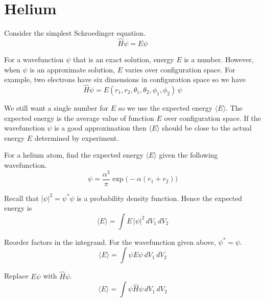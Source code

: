 \documentclass[12pt]{article}
\begin{document}
\section*{Helium}
Consider the simplest Schroedinger equation.
\begin{equation*}
\hat{H}\psi=E\psi
\end{equation*}

For a wavefunction $\psi$ that is an exact solution, energy $E$ is a number.
However, when $\psi$ is an approximate solution, $E$ varies over configuration space.
For example, two electrons have six dimensions in configuration space so we have
\begin{equation*}
\hat{H}\psi=E(r_1,r_2,\theta_1,\theta_2,\phi_1,\phi_2)\,\psi
\end{equation*}

We still want a single number for $E$ so we use the expected energy $\langle E\rangle$.
The expected energy is the average value of function $E$ over configuration space.
If the wavefunction $\psi$ is a good approximation
then $\langle E\rangle$ should be close to the actual energy $E$ determined by experiment.

\bigskip
For a helium atom, find the expected energy $\langle E\rangle$ given the following wavefunction.
\begin{equation*}
\psi=\frac{\alpha^3}{\pi}\exp\bigl(-\alpha (r_1+r_2)\bigr)
\end{equation*}

Recall that $|\psi|^2=\psi^*\psi$ is a probability density function.
Hence the expected energy is
\begin{equation*}
\langle E\rangle=\int E\,|\psi|^2\,dV_1\,dV_2
\end{equation*}

Reorder factors in the integrand.
For the wavefunction given above, $\psi^*=\psi$.
\begin{equation*}
\langle E\rangle=\int\psi E\psi\,dV_1\,dV_2
\end{equation*}

Replace $E\psi$ with $\hat{H}\psi$.
\begin{equation*}
\langle E\rangle=\int\psi\hat{H}\psi\,dV_1\,dV_2
\end{equation*}
\end{document}
